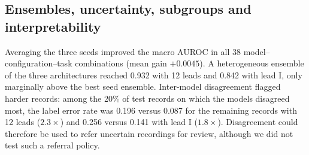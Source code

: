 \begin{table}[t]
\centering
\small
\caption{External validation of frozen T2 models on the Chapman cohort under three label mappings (v2 = main analysis). Sens/spec: sensitivity and specificity at the threshold chosen for 90\% specificity on the PTB-XL validation fold. The negative set (strictly sinus-rhythm records) is identical across mappings, so specificity at the transported threshold does not change; LA-ResNet under v1 and v2 + LVHV is listed in the results files.}
\label{tab:external}
\setlength{\tabcolsep}{4pt}
\end{table}

\subsection{Ensembles, uncertainty, subgroups and interpretability}
Averaging the three seeds improved the macro AUROC in all 38 model--configuration--task combinations (mean gain $+0.0045$). A heterogeneous ensemble of the three architectures reached 0.932 with 12 leads and 0.842 with lead I, only marginally above the best seed ensemble. Inter-model disagreement flagged harder records: among the 20\% of test records on which the models disagreed most, the label error rate was 0.196 versus 0.087 for the remaining records with 12 leads ($2.3\times$) and 0.256 versus 0.141 with lead I ($1.8\times$). Disagreement could therefore be used to refer uncertain recordings for review, although we did not test such a referral policy.

